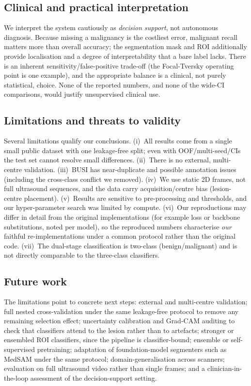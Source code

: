 \documentclass[11pt]{article}
\begin{document}
\subsection{Clinical and practical interpretation}
We interpret the system cautiously as \emph{decision support}, not autonomous
diagnosis. Because missing a malignancy is the costliest error, malignant recall
matters more than overall accuracy; the segmentation mask and ROI additionally
provide localisation and a degree of interpretability that a bare label lacks.
There is an inherent sensitivity/false-positive trade-off (the Focal-Tversky
operating point is one example), and the appropriate balance is a clinical, not
purely statistical, choice. None of the reported numbers, and none of the
wide-CI comparisons, would justify unsupervised clinical use.

\subsection{Limitations and threats to validity}
Several limitations qualify our conclusions. (i)~All results come from a single
small public dataset with one leakage-free split; even with OOF/multi-seed/CIs the
test set cannot resolve small differences. (ii)~There is no external, multi-centre
validation. (iii)~BUSI has near-duplicate and possible annotation issues (including
the cross-class conflict we removed). (iv)~We use static 2D frames, not full
ultrasound sequences, and the data carry acquisition/centre bias (lesion-centre
placement). (v)~Results are sensitive to pre-processing and thresholds, and our
hyper-parameter search was limited by compute. (vi)~Our reproductions may differ in
detail from the original implementations (for example loss or backbone
substitutions, noted per model), so the reproduced numbers characterise \emph{our}
faithful re-implementations under a common protocol rather than the original code.
(vii)~The dual-stage classification is two-class (benign/malignant) and is not
directly comparable to the three-class classifiers.

\subsection{Future work}
\label{sec:future}
The limitations point to concrete next steps: external and multi-centre validation;
full nested cross-validation under the same leakage-free protocol to remove any
remaining selection effect; uncertainty calibration and Grad-CAM auditing to check
that classifiers attend to the lesion rather than to artefacts; stronger or
ensembled ROI classifiers, since the pipeline is classifier-bound; ensemble or
self-supervised pretraining; adaptation of foundation-model segmenters such as
MedSAM under the same protocol; domain-generalisation across scanners; evaluation
on full ultrasound video rather than single frames; and a clinician-in-the-loop
assessment of the decision-support setting.
\end{document}
